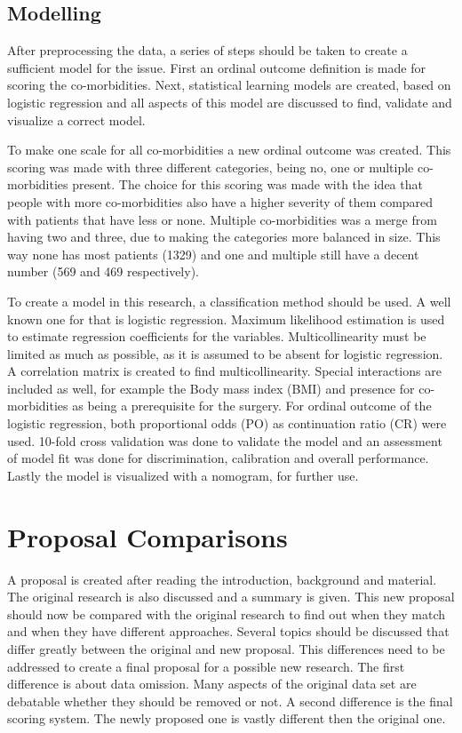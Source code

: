 \documentclass[10pt,a4paper]{article}
\begin{document}
	\subsection{Modelling}
	
	After preprocessing the data, a series of steps should be taken to create a sufficient model for the issue. First an ordinal outcome definition is made for scoring the co-morbidities. Next, statistical learning models are created, based on logistic regression and all aspects of this model are discussed to find, validate and visualize a correct model.
	
	To make one scale for all co-morbidities a new ordinal outcome was created. This scoring was made with three different categories, being no, one or multiple co-morbidities present. The choice for this scoring was made with the idea that people with more co-morbidities also have a higher severity of them compared with patients that have less or none. Multiple co-morbidities was a merge from having two and three, due to making the categories more balanced in size. This way none has most patients (1329) and one and multiple still have a decent number (569 and 469 respectively). 
	
	To create a model in this research, a classification method should be used. A well known one for that is logistic regression. Maximum likelihood estimation is used to estimate regression coefficients for the variables. Multicollinearity must be limited as much as possible, as it is assumed to be absent for logistic regression. A correlation matrix is created to find multicollinearity. Special interactions are included as well, for example the Body mass index (BMI) and presence for co-morbidities as being a prerequisite for the surgery. For ordinal outcome of the logistic regression, both proportional odds (PO) as continuation ratio (CR) were used. 10-fold cross validation was done to validate the model and an assessment of model fit was done for discrimination, calibration and overall performance. Lastly the model is visualized with a nomogram, for further use.
	
	\section{Proposal Comparisons}
	
	A proposal is created after reading the introduction, background and material. The original research is also discussed and a summary is given. This new proposal should now be compared with the original research to find out when they match and when they have different approaches. Several topics should be discussed that differ greatly between the original and new proposal. This differences need to be addressed to create a final proposal for a possible new research. The first difference is about data  omission. Many aspects of the original data set are debatable whether they should be removed or not. A second difference is the final scoring system. The newly proposed one is vastly different then the original one.
	
\end{document}
